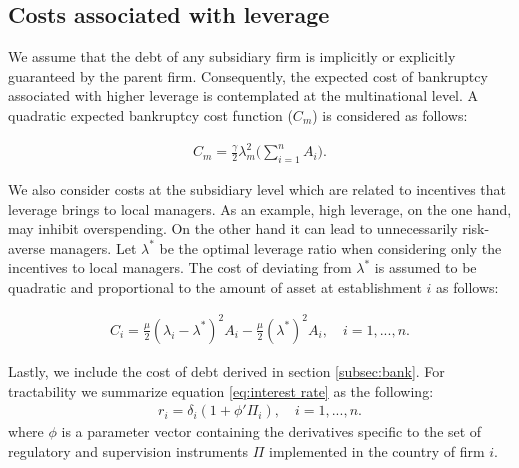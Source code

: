 \documentclass[12pt]{article}
\begin{document}
	\subsection{Costs associated with leverage}
	\label{subsec:costs}
	We assume that the debt of any subsidiary firm is implicitly or explicitly guaranteed by the parent firm. Consequently, the expected cost of bankruptcy associated with higher leverage is contemplated at the multinational level. A quadratic expected bankruptcy cost function ($C_m$) is considered as follows:
	
	\begin{equation}
	\begin{aligned}
	C_m=\frac{\gamma}{2}\lambda_m^2\bigg(\sum_{i=1}^{n}A_i\bigg).
	\end{aligned}
	\label{eq:cost bankruptcy}
	\end{equation}
	
	We also consider costs at the subsidiary level which are related to incentives that leverage brings to local managers. As an example, high leverage, on the one hand, may inhibit overspending. On the other hand it can lead to unnecessarily risk-averse managers. Let $\lambda^*$ be the optimal leverage ratio when considering only the incentives to local managers. The cost of deviating from $\lambda^*$ is assumed to be quadratic and proportional to the amount of asset at establishment $i$ as follows:  
	
	\begin{equation}
	\begin{aligned}
	C_i=\frac{\mu}{2}(\lambda_i-\lambda^*)^2A_i-\frac{\mu}{2}(\lambda^*)^2A_i, \quad i=1,...,n.
	\end{aligned}
	\label{eq:agency cost}
	\end{equation}
	
	Lastly, we include the cost of debt derived in section \ref{subsec:bank}. For tractability we summarize equation \ref{eq:interest rate} as the following:
	\begin{equation}
	\begin{aligned}
	r_i=\delta_i(1+\phi'\Pi_i), \quad i=1,...,n.
	\end{aligned}
	\label{eq:cost of debt}
	\end{equation}
	where $\phi$ is a parameter vector containing the derivatives specific to the set of regulatory and supervision instruments $\Pi$ implemented in the country of firm $i$.	
	
\end{document}
